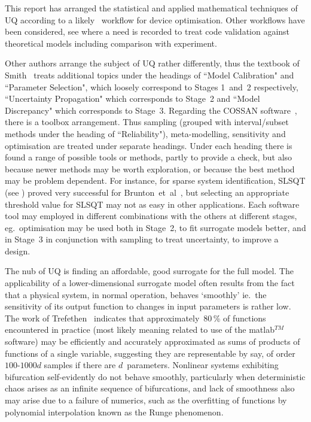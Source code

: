 This report has arranged the statistical and applied mathematical techniques of UQ 
according to a likely \nep\ workflow for device optimisation.
Other workflows have been considered, see  where a need is
recorded to treat code validation against theoretical models 
including comparison with experiment.

Other authors arrange the subject of UQ rather differently,
thus the textbook of Smith~\cite{smithUQ} treats additional topics under the headings
of ``Model Calibration" and ``Parameter Selection", which loosely correspond to Stages 1~and~2
respectively, ``Uncertainty Propagation" which corresponds to Stage~2
and ``Model Discrepancy" which corresponds to Stage~3.
Regarding the COSSAN software~\cite{Pa14Open}, there is a toolbox arrangement.
Thus sampling (grouped with interval/subset methods under the heading of ``Reliability"),
meta-modelling, sensitivity and optimisation are treated under separate headings.
Under each heading there is found a range of possible tools or methods, partly to provide a check,
but also because newer methods may be worth exploration, or 
because the best method may be problem dependent.
For instance, for sparse system identification, SLSQT (see )
proved very successful for Brunton~et~al~\cite{Br16Disc}, but selecting an
appropriate threshold value for SLSQT may not as easy in other applications.
Each software tool may employed in different combinations with the others at different stages,
eg.\ optimisation may be used both in Stage~2, to fit surrogate models better, and in Stage~3
in conjunction with sampling to treat uncertainty, to improve a design.

The nub of UQ is finding an affordable, good surrogate for the full model.
The applicability of a lower-dimensional surrogate model 
often results from the fact that a physical system, in normal operation, behaves `smoothly'
ie.\  the sensitivity of its output function to changes in input parameters is rather low. 
The work of Trefethen~\cite{To15Cont,Ha17Cheb,Tr20Priz} indicates that
approximately~$80$\,\% of functions encountered in practice (most
likely meaning related to use of the matlab$^{TM}$ software) may be
efficiently and accurately approximated as sums of products of functions
of a single variable, suggesting they are representable by say, of order~$100$-$1000d$ samples
if there are $d$~parameters.
Nonlinear systems exhibiting bifurcation self-evidently do not behave smoothly, particularly
when deterministic chaos arises as an infinite sequence of bifurcations, and
lack of smoothness also may arise due to a failure of numerics, such as
the overfitting of functions by polynomial interpolation known as the Runge phenomenon.

